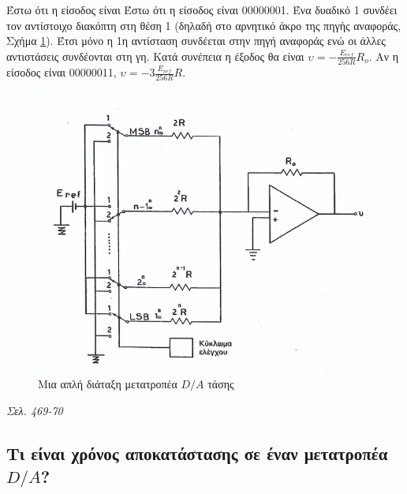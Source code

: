 \documentclass{article}
\begin{document}
Έστω ότι η είσοδος είναι Έστω ότι η είσοδος είναι 00000001. Ένα δυαδικό 1 συνδέει τον αντίστοιχο διακόπτη στη θέση 1 (δηλαδή στο αρνητικό άκρο της πηγής αναφοράς, Σχήμα \ref{DAtashs}). Έτσι
μόνο η 1η αντίσταση συνδέεται στην πηγή αναφοράς ενώ οι άλλες αντιστάσεις συνδέονται στη γη. Κατά συνέπεια η έξοδος θα είναι $\upsilon = -\frac{E_{ref}}{256R}R_o$. Αν η είσοδος είναι
00000011, $\upsilon = -3\frac{E_{ref}}{256R}R$.

\begin{figure}
    \includegraphics[width=\linewidth]{DAtashs.png}
    \caption{Μια απλή διάταξη μετατροπέα $D/A$ τάσης}
    \label{DAtashs}
\end{figure}

\emph{Σελ. 469-70}

\subsection{Τι είναι χρόνος αποκατάστασης σε έναν μετατροπέα $D/A$?}
\end{document}
